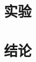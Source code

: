 \documentclass[10pt,twocolumn,letterpaper,UTF8]{article}
\begin{document}
\section{实验}


\section{结论}




{\small

\begin{thebibliography}{}

\end{thebibliography}



}

\newpage



% 
\end{document}
